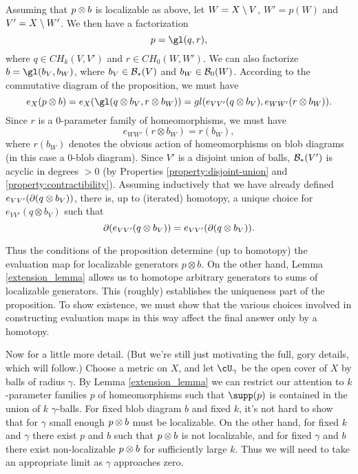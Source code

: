 {Assuming that $p\otimes b$ is localizable as above, 
let $W = X \setminus V$, $W' = p(W)$ and $V' = X\setminus W'$.
We then have a factorization 
\[
	p = \gl(q, r),
\]
where $q \in CH_k(V, V')$ and $r \in CH_0(W, W')$.
We can also factorize $b = \gl(b_V, b_W)$, where $b_V\in {\mathcal B}_*(V)$ and $b_W\in{\mathcal B}_0(W)$.
According to the commutative diagram of the proposition, we must have
\[
	e_X(p\otimes b) = e_X(\gl(q\otimes b_V, r\otimes b_W)) = 
				gl(e_{VV'}(q\otimes b_V), e_{WW'}(r\otimes b_W)) .
\]
Since $r$ is a  0-parameter family of homeomorphisms, we must have
\[
	e_{WW'}(r\otimes b_W) = r(b_W),
\]
where $r(b_W)$ denotes the obvious action of homeomorphisms on blob diagrams (in
this case a 0-blob diagram).
Since $V'$ is a disjoint union of balls, ${\mathcal B}_*(V')$ is acyclic in degrees $>0$ 
(by Properties \ref{property:disjoint-union} and \ref{property:contractibility}).
Assuming inductively that we have already defined $e_{VV'}(\partial(q\otimes b_V))$,
there is, up to (iterated) homotopy, a unique choice for $e_{VV'}(q\otimes b_V)$
such that 
\[
	\partial(e_{VV'}(q\otimes b_V)) = e_{VV'}(\partial(q\otimes b_V)) .
\]

Thus the conditions of the proposition determine (up to homotopy) the evaluation
map for localizable generators $p\otimes b$.
On the other hand, Lemma \ref{extension_lemma} allows us to homotope 
arbitrary generators to sums of localizable generators.
This (roughly) establishes the uniqueness part of the proposition.
To show existence, we must show that the various choices involved in constructing
evaluation maps in this way affect the final answer only by a homotopy.

Now for a little more detail.
(But we're still just motivating the full, gory details, which will follow.)
Choose a metric on $X$, and let $\cU_\gamma$ be the open cover of $X$ by balls of radius $\gamma$.
By Lemma \ref{extension_lemma} we can restrict our attention to $k$-parameter families 
$p$ of homeomorphisms such that $\supp(p)$ is contained in the union of $k$ $\gamma$-balls.
For fixed blob diagram $b$ and fixed $k$, it's not hard to show that for $\gamma$ small enough
$p\otimes b$ must be localizable.
On the other hand, for fixed $k$ and $\gamma$ there exist $p$ and $b$ such that $p\otimes b$ is not localizable,
and for fixed $\gamma$ and $b$ there exist non-localizable $p\otimes b$ for sufficiently large $k$.
Thus we will need to take an appropriate limit as $\gamma$ approaches zero.

}

